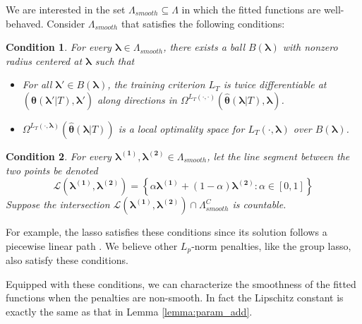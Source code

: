 \documentclass[12pt]{article}
\newtheorem{condition}{Condition}
\begin{document}
We are interested in the set $\Lambda_{smooth} \subseteq \Lambda$ in which the fitted functions are well-behaved. Consider $\Lambda_{smooth}$ that satisfies the following conditions:

\begin{condition}
	\label{condn:nonsmooth1}
	For every $\boldsymbol{\lambda} \in \Lambda_{smooth}$, there exists a ball $B(\boldsymbol{\lambda})$ with nonzero radius centered at $\boldsymbol{\lambda}$ such that
	\begin{itemize}
		\item For all $\boldsymbol{\lambda}'\in B(\boldsymbol{\lambda})$, the training criterion $L_{T}$ is twice differentiable at $(\hat{\boldsymbol{\theta}}(\boldsymbol{\lambda}'|T), \boldsymbol{\lambda}')$
		along directions in $\Omega^{L_{T}(\cdot,\cdot)}\left(\hat{\boldsymbol{\theta}}(\boldsymbol{\lambda} | T), \boldsymbol{\lambda}\right)$.
		\item $\Omega^{L_T(\cdot, \boldsymbol{\lambda})} \left (\hat{\boldsymbol \theta}\left(\boldsymbol{\lambda}|T \right) \right)$ is a local optimality space for $L_T\left(\cdot,\boldsymbol{\lambda}\right)$ over $B(\boldsymbol{\lambda})$.
	\end{itemize}
\end{condition}
\begin{condition}
	\label{condn:nonsmooth2}
	For every $\boldsymbol{\lambda^{(1)}},\boldsymbol{\lambda^{(2)}}\in\Lambda_{smooth}$, let the line segment between the two points be denoted 
	$$
	\mathcal{L}(\boldsymbol{\lambda^{(1)}},\boldsymbol{\lambda^{(2)}})=\left\{ \alpha\boldsymbol{\lambda^{(1)}}+(1-\alpha)\boldsymbol{\lambda^{(2)}}:\alpha\in[0,1]\right\} 
	$$
	Suppose the intersection $\mathcal{L}(\boldsymbol{\lambda^{(1)}},\boldsymbol{\lambda^{(2)}})\cap\Lambda_{smooth}^{C}$
	is countable.
\end{condition}
For example, the lasso satisfies these conditions since its solution follows a piecewise linear path \citep{efron2004least, tibshirani2011solution}. We believe other $L_p$-norm penalties, like the group lasso, also satisfy these conditions.

Equipped with these conditions, we can characterize the smoothness of the fitted functions when the penalties are non-smooth. In fact the Lipschitz constant is exactly the same as that in Lemma \ref{lemma:param_add}.
\end{document}
